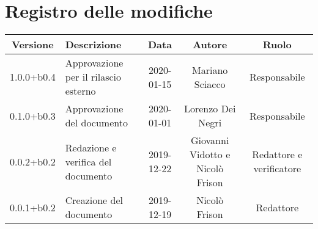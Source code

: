 \section*{Registro delle modifiche}

\begin{center}
	\begin{longtable}{|c|p{3cm}|c|c|c|}
	\hline
	\rowcolor{lighter-grayer}
	\textbf{Versione} & \textbf{Descrizione} & \textbf{Data} & \textbf{Autore} & \textbf{Ruolo} \\
	\hline
	\endfirsthead


	1.0.0+b0.4 & Approvazione per il rilascio esterno & 2020-01-15 & Mariano Sciacco & Responsabile \\
	\hline
	0.1.0+b0.3 & Approvazione del documento & 2020-01-01 & Lorenzo Dei Negri & Responsabile \\
	\hline
	0.0.2+b0.2 & Redazione e verifica del documento & 2019-12-22 & Giovanni Vidotto e Nicolò Frison & Redattore e verificatore \\
	\hline
	0.0.1+b0.2 & Creazione del documento & 2019-12-19 & Nicolò Frison & Redattore \\
	\hline

	\end{longtable}
\end{center}